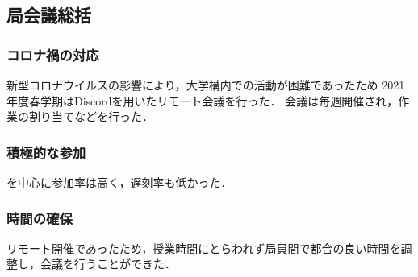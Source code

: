 \subsection*{局会議総括}

\subsubsection*{コロナ禍の対応}

新型コロナウイルスの影響により，大学構内での活動が困難であったため
2021年度春学期はDiscordを用いたリモート会議を行った．
会議は毎週開催され，作業の割り当てなどを行った．

\subsubsection*{積極的な参加}

\secondGrade{}を中心に参加率は高く，遅刻率も低かった．

\subsubsection*{時間の確保}

リモート開催であったため，授業時間にとらわれず局員間で都合の良い時間を調整し，会議を行うことができた．
